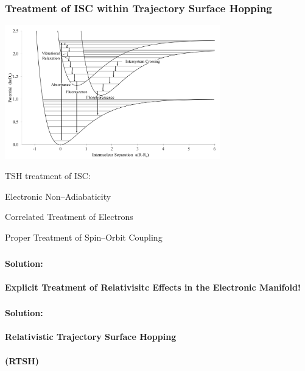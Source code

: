 \documentclass[usepdftitle=false,10pt]{beamer}
\newcommand{\cmark}{\color{green} \ding{51}}%
\newcommand{\xmark}{\color{red} \ding{55}}%
\newcommand{\done}{\rlap{$\square$}{\raisebox{2pt}{\large\hspace{1pt}\cmark}}%
\hspace{-2.5pt}}
\newcommand{\wontfix}{\rlap{$\square$}{\large\hspace{1pt}\xmark}}
\begin{document}
\begin{frame}
  \frametitle{Treatment of ISC within Trajectory Surface Hopping}
  \begin{center}
  \includegraphics[width=0.7\textwidth]{ISC} 
  \end{center}
  \vspace{-0.5cm}
  TSH treatment of ISC: 
  \begin{mylist}
    \item[\done] Electronic Non--Adiabaticity
    \item[\done] Correlated Treatment of Electrons
    \item[\wontfix] Proper Treatment of Spin--Orbit Coupling
  \end{mylist}
\end{frame}

\begin{frame}
  \frametitle{}
  \begin{center}
  {\LARGE \bf Solution: \\~\\ Explicit Treatment of Relativisitc Effects in the Electronic Manifold!}
  \end{center}
\end{frame}

\begin{frame}
  \frametitle{}
  \begin{center}
  {\LARGE \bf Solution: \\~\\ Relativistic Trajectory Surface Hopping \\~\\(RTSH)}
  \end{center}
\end{frame}
\end{document}
